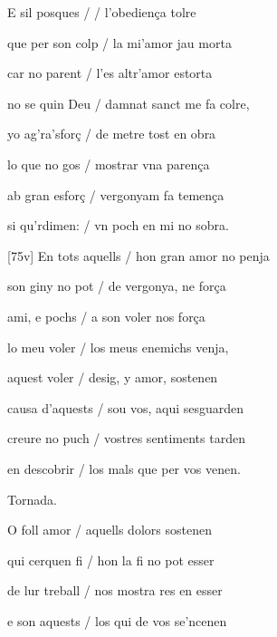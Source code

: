 \documentclass[12pt]{article}
\begin{document}
\begin{estrofa}

 E sil posques / / l'obedien\c{c}a tolre

 que per son colp / la mi'amor jau morta

 car no parent / l'es altr'amor estorta

 no se quin Deu / damnat sanct me fa colre,

 yo ag'ra'sfor\c{c} / de metre tost en obra

 lo que no gos / mostrar vna paren\c{c}a

 ab gran esfor\c{c} / vergonyam fa temen\c{c}a

 si qu'rdimen: / vn poch en mi no sobra.

\end{estrofa}



\begin{estrofa}

 [75v] En tots aquells / hon gran amor no penja

 son giny no pot / de vergonya, ne for\c{c}a

 ami, e pochs / a son voler nos for\c{c}a

 lo meu voler / los meus enemichs venja,

 aquest voler / desig, y amor, sostenen

 causa d'aquests / sou vos, aqui sesguarden

 creure no puch / vostres sentiments tarden

 en descobrir / los mals que per vos venen.

\end{estrofa}


\begin{estrofaExtra}%




\begin{tornada}

Tornada.

\end{tornada}


\end{estrofaExtra}


\begin{estrofa}

 O foll amor / aquells dolors sostenen

 qui cerquen fi / hon la fi no pot esser

 de lur treball / nos mostra res en esser

 e son aquests / los qui de vos se'ncenen

\end{estrofa}
\end{document}
